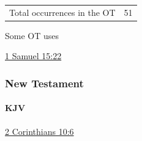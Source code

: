 				\begin{tabular}{ll}
					Total occurrences in the OT & 51
				\end{tabular}
				
				\begin{compactdesc}
					\item[Some OT uses] \textbf{}
						\begin{compactdesc}
							\item[{\hyperref[1SAMUEL-15-22]{1 Samuel 15:22}}]
						\end{compactdesc}
				\end{compactdesc}
		
	\subsubsection{New Testament} %
		\label{OBEDIENCE-NT}
	
		\paragraph{KJV}
			\label{OBEDIENCE-NT-KJV}		
	
			
			\begin{compactdesc}
				\item[{\hyperref[2CORINTHIANS-10-6]{2 Corinthians 10:6}}]
			\end{compactdesc}
			
		
			
				
